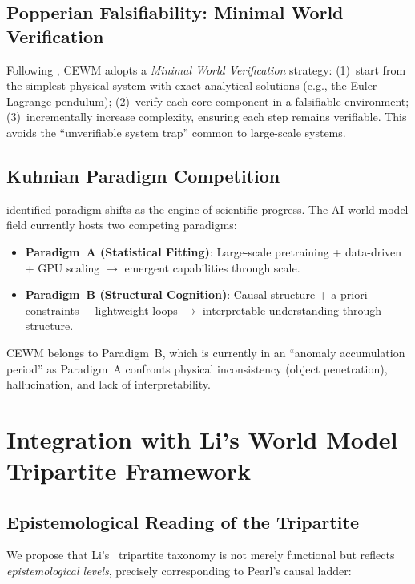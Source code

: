 \documentclass[11pt,a4paper]{article}
\newcommand{\CEWM}{\textsc{CEWM}}
\begin{document}
\subsection{Popperian Falsifiability: Minimal World Verification}

Following \citet{popper1934logik}, \CEWM{} adopts a \emph{Minimal World Verification} strategy: (1)~start from the simplest physical system with exact analytical solutions (e.g., the Euler--Lagrange pendulum); (2)~verify each core component in a falsifiable environment; (3)~incrementally increase complexity, ensuring each step remains verifiable. This avoids the ``unverifiable system trap'' common to large-scale systems.

\subsection{Kuhnian Paradigm Competition}

\citet{kuhn1962structure} identified paradigm shifts as the engine of scientific progress. The AI world model field currently hosts two competing paradigms:
\begin{itemize}[nosep]
  \item \textbf{Paradigm~A (Statistical Fitting)}: Large-scale pretraining + data-driven + GPU scaling $\to$ emergent capabilities through scale.
  \item \textbf{Paradigm~B (Structural Cognition)}: Causal structure + a priori constraints + lightweight loops $\to$ interpretable understanding through structure.
\end{itemize}
\CEWM{} belongs to Paradigm~B, which is currently in an ``anomaly accumulation period'' as Paradigm~A confronts physical inconsistency (object penetration), hallucination, and lack of interpretability.

\section{Integration with Li's World Model Tripartite Framework}\label{sec:li-framework}

\subsection{Epistemological Reading of the Tripartite}

We propose that Li's~\citeyearpar{li2024worldmodels} tripartite taxonomy is not merely functional but reflects \emph{epistemological levels}, precisely corresponding to Pearl's causal ladder:
\end{document}
